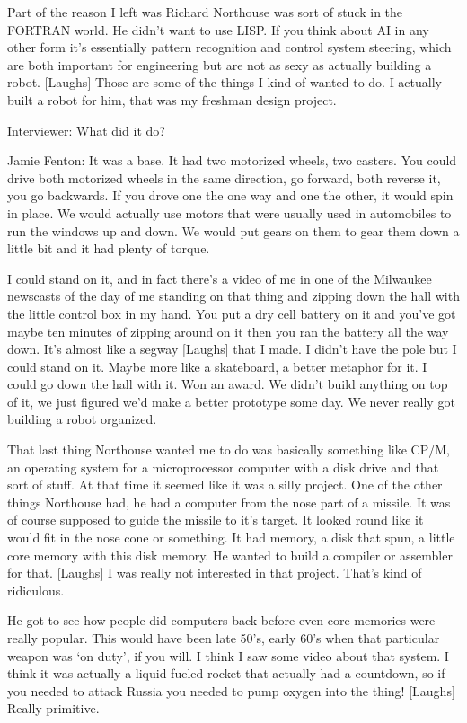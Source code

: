 Part of the reason I left was Richard Northouse was sort of stuck in the FORTRAN world. He didn’t want to use LISP. If you think about AI in any other form it’s essentially pattern recognition and control system steering, which are both important for engineering but are not as sexy as actually building a robot. [Laughs] Those are some of the things I kind of wanted to do. I actually built a robot for him, that was my freshman design project.

\textcolor{interviewer}{Interviewer:} What did it do?

\textcolor{interviewee}{Jamie Fenton:} It was a base. It had two motorized wheels, two casters. You could drive both motorized wheels in the same direction, go forward, both reverse it, you go backwards. If you drove one the one way and one the other, it would spin in place. We would actually use motors that were usually used in automobiles to run the windows up and down. We would put gears on them to gear them down a little bit and it had plenty of torque.

I could stand on it, and in fact there’s a video of me in one of the Milwaukee newscasts of the day of me standing on that thing and zipping down the hall with the little control box in my hand. You put a dry cell battery on it and you’ve got maybe ten minutes of zipping around on it then you ran the battery all the way down. It’s almost like a segway [Laughs] that I made. I didn’t have the pole but I could stand on it. Maybe more like a skateboard, a better metaphor for it. I could go down the hall with it. Won an award. We didn’t build anything on top of it, we just figured we’d make a better prototype some day. We never really got building a robot organized.

That last thing Northouse wanted me to do was basically something like CP/M, an operating system for a microprocessor computer with a disk drive and that sort of stuff. At that time it seemed like it was a silly project. One of the other things Northouse had, he had a computer from the nose part of a missile. It was of course supposed to guide the missile to it’s target. It looked round like it would fit in the nose cone or something. It had memory, a disk that spun, a little core memory with this disk memory. He wanted to build a compiler or assembler for that. [Laughs] I was really not interested in that project. That’s kind of ridiculous.

He got to see how people did computers back before even core memories were really popular. This would have been late 50’s, early 60’s when that particular weapon was ‘on duty’, if you will. I think I saw some video about that system. I think it was actually a liquid fueled rocket that actually had a countdown, so if you needed to attack Russia you needed to pump oxygen into the thing! [Laughs] Really primitive.

